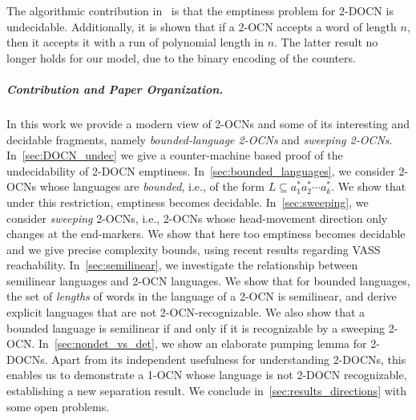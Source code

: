 \documentclass[USenglish]{lipics-v2021}
\begin{document}
	The algorithmic contribution in~\cite{chan1987two} is that the emptiness problem for 2-DOCN is undecidable. Additionally, it is shown that if a 2-OCN accepts a word of length $n$, then it accepts it with a run of polynomial length in $n$. The latter result no longer holds for our model, due to the binary encoding of the counters.
	
	
	\subparagraph*{Contribution and Paper Organization.}  In this work we
	provide a modern view of 2-OCNs and some of its interesting and decidable
	fragments, namely \emph{bounded-language 2-OCNs} and \emph{sweeping
		2-OCNs}. In~\cref{sec:DOCN_undec} we give a counter-machine based proof of the
	undecidability of 2-DOCN emptiness.  In~\cref{sec:bounded_languages}, we
	consider 2-OCNs whose languages are \emph{bounded}, i.e., of the form
	$L\subseteq a_1^*a_2^*\cdots a_k^*$.  We show that under this restriction, emptiness becomes
	decidable. In~\cref{sec:sweeping}, we consider \emph{sweeping} 2-OCNs, i.e.,
	2-OCNs whose head-movement direction only changes at the end-markers.  We show
	that here too emptiness becomes decidable and we give precise complexity bounds,
	using recent results regarding VASS reachability.  In~\cref{sec:semilinear}, we
	investigate the relationship between semilinear languages and 2-OCN
	languages. We show that for bounded languages, the set of \emph{lengths} of
	words in the language of a 2-OCN is semilinear, and derive explicit languages
	that are not 2-OCN-recognizable.  We also show that a bounded language is
	semilinear if and only if it is recognizable by a sweeping 2-OCN.
	In~\cref{sec:nondet_vs_det}, we show an elaborate pumping lemma for
	2-DOCNs. Apart from its independent usefulness for understanding 2-DOCNs, this
	enables us to demonstrate a 1-OCN whose language is not 2-DOCN recognizable,
	establishing a new separation result.  We conclude
	in~\cref{sec:results_directions} with some open problems.
	
\end{document}
